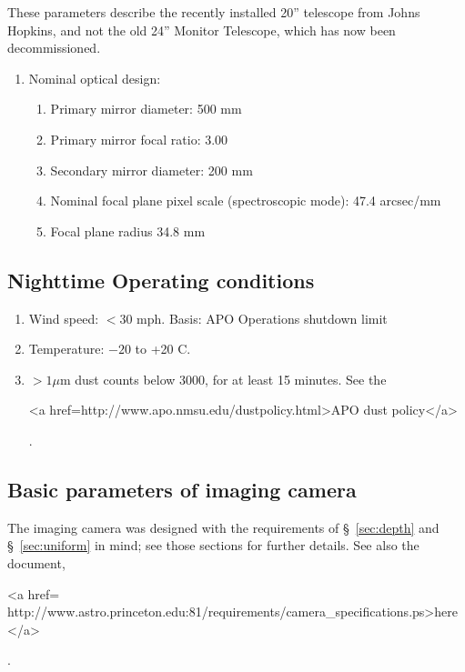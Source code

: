 These parameters describe the recently installed 20'' telescope from
Johns Hopkins, and not the old 24'' Monitor Telescope, which has now
been decommissioned. 

\begin{enumerate}

\item Nominal optical design:
\begin{enumerate}
\item Primary mirror diameter: 500 mm
\item Primary mirror focal ratio: 3.00
\item Secondary mirror diameter: 200 mm
\item Nominal focal plane pixel scale (spectroscopic mode): 47.4 arcsec/mm
\item Focal plane radius 34.8 mm
\end{enumerate}

\end{enumerate}

\subsection{Nighttime Operating conditions}

\begin{enumerate}
\item Wind speed: $<30$ mph.\hfil\break
Basis: APO Operations shutdown limit
\item Temperature: $-20$ to +20 C.
\item $>1\mu$m dust counts below 3000, for at least 15 minutes.  See
the 
\begin{rawhtml}
<a href=http://www.apo.nmsu.edu/dustpolicy.html>APO dust
policy</a>\end{rawhtml}. 
\end{enumerate}


\subsection{Basic parameters of imaging camera}
\label{sec:camera-param}
The imaging camera was designed with the requirements of
\S~\ref{sec:depth} and \S~\ref{sec:uniform} in mind; see those
sections for further details.   See also the document, 
\begin{rawhtml}
<a href= http://www.astro.princeton.edu:81/requirements/camera_specifications.ps>here</a>\end{rawhtml}.


